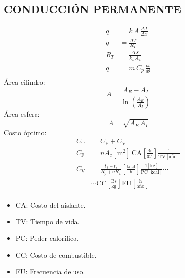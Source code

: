 \documentclass[letter,oneside,10pt]{article}
\begin{document}
\begin{multicols}{3}
\section*{CONDUCCIÓN PERMANENTE}
\begin{equation*}
    \begin{split}
        q &= k\,A\,\frac{\Delta T}{\Delta x}\\
        q &= \frac{\Delta T}{R_T}\\
        R_T &= \frac{\Delta X}{k_x\,A_x}\\
        q &= m\,C_p\,\frac{dt}{d\theta}\\
    \end{split}
\end{equation*}
Área cilindro:
\vspace{-0.4cm}
\begin{equation*}
    A=\frac{A_E-A_I}{\ln\left(\frac{A_E}{A_I}\right)}
\end{equation*}
Área esfera:
\vspace{-0.4cm}
\begin{equation*}
    A=\sqrt{A_E\,A_I}
\end{equation*}
\underline{Costo óptimo}:
\begin{equation*}
    \begin{split}
        C_{\text{T}} &= C_{\text{F}}+C_{\text{V}}\\
        C_{\text{F}} &= nA_x[\text{m}^2]\,\text{CA}
                        \left[\frac{\text{Bs}}{\text{m}^2}\right]
                        \frac{1}{\text{TV}[\text{año}]}\\
        C_{\text{V}} &= \frac{t_f-t_i}{R_p+nR_x}
                        \left[\frac{\text{kcal}}{\text{h}}\right]
                        \frac{1[\text{kg}]}{\text{PC}[\text{kcal}]}\cdots\\
                     &  \cdots\text{CC}\left[\frac{\text{Bs}}{\text{kg}}\right]
                        \text{FU}\left[\frac{\text{h}}{\text{año}}\right]\\
    \end{split}
\end{equation*}
\tiny
\begin{itemize}
    \item CA: Costo del aislante.
    \item TV: Tiempo de vida.
    \item PC: Poder calorífico.
    \item CC: Costo de combustible.
    \item FU: Frecuencia de uso.
\end{itemize}


\end{multicols}
\end{document}
